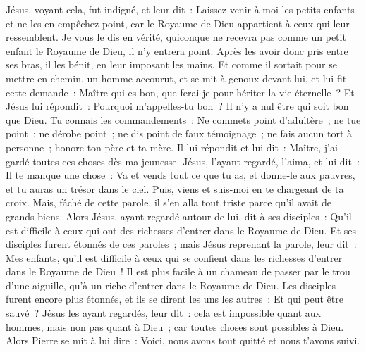 \begin{multicols}{2}
Jésus, voyant cela, fut indigné, et leur dit~: Laissez venir à moi les petits enfants et ne les en empêchez point, car le Royaume de Dieu appartient à ceux qui leur ressemblent.
Je vous le dis en vérité, quiconque ne recevra pas comme un petit enfant le Royaume de Dieu, il n'y entrera point.
Après les avoir donc pris entre ses bras, il les bénit, en leur imposant les mains.
Et comme il sortait pour se mettre en chemin, un homme accourut, et se mit à genoux devant lui, et lui fit cette demande~: Maître qui es bon, que ferai-je pour hériter la vie éternelle~?
Et Jésus lui répondit~: Pourquoi m'appelles-tu bon~? Il n'y a nul être qui soit bon que Dieu.
Tu connais les commandements~: Ne commets point d'adultère~; ne tue point~; ne dérobe point~; ne dis point de faux témoignage~; ne fais aucun tort à personne~; honore ton père et ta mère.
Il lui répondit et lui dit~: Maître, j'ai gardé toutes ces choses dès ma jeunesse.
Jésus, l'ayant regardé, l'aima, et lui dit~: Il te manque une chose~: Va et vends tout ce que tu as, et donne-le aux pauvres, et tu auras un trésor dans le ciel. Puis, viens et suis-moi en te chargeant de ta croix.
Mais, fâché de cette parole, il s'en alla tout triste parce qu'il avait de grands biens.
Alors Jésus, ayant regardé autour de lui, dit à ses disciples~: Qu'il est difficile à ceux qui ont des richesses d'entrer dans le Royaume de Dieu.
Et ses disciples furent étonnés de ces paroles~; mais Jésus reprenant la parole, leur dit~: Mes enfants, qu'il est difficile à ceux qui se confient dans les richesses d'entrer dans le Royaume de Dieu~!
Il est plus facile à un chameau de passer par le trou d'une aiguille, qu'à un riche d'entrer dans le Royaume de Dieu.
Les disciples furent encore plus étonnés, et ils se dirent les uns les autres~: Et qui peut être sauvé~?
Jésus les ayant regardés, leur dit~: cela est impossible quant aux hommes, mais non pas quant à Dieu~; car toutes choses sont possibles à Dieu.
Alors Pierre se mit à lui dire~: Voici, nous avons tout quitté et nous t'avons suivi.

\end{multicols}
